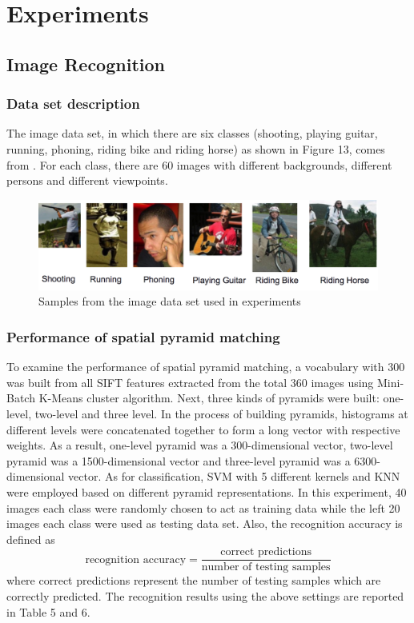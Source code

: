 \section{Experiments}
\subsection{Image Recognition}
\subsubsection{Data set description}
The image data set, in which there are six classes (shooting, playing guitar, running, phoning, riding bike and riding horse) as shown in Figure 13, comes from \cite{li2011actions}. For each class, there are 60 images with different backgrounds, different persons and different viewpoints. 

\begin{figure}[!ht]
\centering
  \includegraphics[width=1\textwidth]{./imageSet.png}
\caption{Samples from the image data set used in experiments \cite{li2011actions}}
\end{figure}

\subsubsection{Performance of spatial pyramid matching}
To examine the performance of spatial pyramid matching, a vocabulary with 300 was built from all SIFT features extracted from the total 360 images using Mini-Batch K-Means cluster algorithm. Next, three kinds of pyramids were built: one-level, two-level and three level. In the process of building pyramids, histograms at different levels were concatenated together to form a long vector with respective weights. As a result, one-level pyramid was a 300-dimensional vector, two-level pyramid was a 1500-dimensional vector and three-level pyramid was a 6300-dimensional vector. As for classification, SVM with 5 different kernels and KNN were employed based on different pyramid representations. In this experiment, 40 images each class were randomly chosen to act as training data while the left 20 images each class were used as testing data set. Also, the recognition accuracy is defined as 
\begin{equation}
\text{recognition accuracy} = \frac{\text{correct predictions}}{\text{number of testing samples}}
\end{equation}
where correct predictions represent the number of testing samples which are correctly predicted. The recognition results using the above settings are reported in Table 5 and 6. \\

